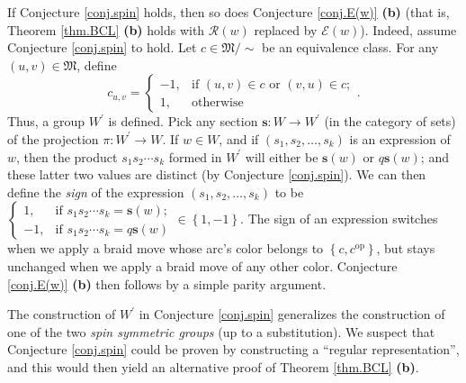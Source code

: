 \documentclass[numbers=enddot,12pt,final,onecolumn,notitlepage,abstracton]{scrartcl}%
\theoremstyle{definition}
\begin{document}
If Conjecture \ref{conj.spin} holds, then so does Conjecture \ref{conj.E(w)}
\textbf{(b)} (that is, Theorem \ref{thm.BCL} \textbf{(b)} holds with
$\mathcal{R}\left(  w\right)  $ replaced by $\mathcal{E}\left(  w\right)  $).
Indeed, assume Conjecture \ref{conj.spin} to hold. Let $c\in\mathfrak{M}/\sim$
be an equivalence class. For any $\left(  u,v\right)  \in\mathfrak{M}$, define%
\[
c_{u,v}=%
\begin{cases}
-1, & \text{if }\left(  u,v\right)  \in c\text{ or }\left(  v,u\right)  \in
c;\\
1, & \text{otherwise}%
\end{cases}
.
\]
Thus, a group $W^{\prime}$ is defined. Pick any section $\mathbf{s}%
:W\rightarrow W^{\prime}$ (in the category of sets) of the projection
$\pi:W^{\prime}\rightarrow W$. If $w\in W$, and if $\left(  s_{1},s_{2}%
,\ldots,s_{k}\right)  $ is an expression of $w$, then the product $s_{1}%
s_{2}\cdots s_{k}$ formed in $W^{\prime}$ will either be $\mathbf{s}\left(
w\right)  $ or $q\mathbf{s}\left(  w\right)  $; and these latter two values
are distinct (by Conjecture \ref{conj.spin}). We can then define the
\emph{sign} of the expression $\left(  s_{1},s_{2},\ldots,s_{k}\right)  $ to
be $%
\begin{cases}
1, & \text{if }s_{1}s_{2}\cdots s_{k}=\mathbf{s}\left(  w\right)  ;\\
-1, & \text{if }s_{1}s_{2}\cdots s_{k}=q\mathbf{s}\left(  w\right)
\end{cases}
\in\left\{  1,-1\right\}  $. The sign of an expression switches when we apply
a braid move whose arc's color belongs to $\left\{  c,c^{\operatorname*{op}%
}\right\}  $, but stays unchanged when we apply a braid move of any other
color. Conjecture \ref{conj.E(w)} \textbf{(b)} then follows by a simple parity argument.

The construction of $W^{\prime}$ in Conjecture \ref{conj.spin} generalizes the
construction of one of the two \emph{spin symmetric groups} (up to a
substitution). We suspect that Conjecture \ref{conj.spin} could be proven by
constructing a \textquotedblleft regular representation\textquotedblright, and
this would then yield an alternative proof of Theorem \ref{thm.BCL}
\textbf{(b)}.
\end{document}
